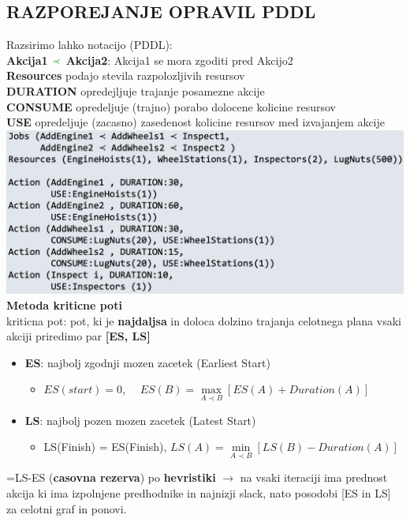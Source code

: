 \subsection{RAZPOREJANJE OPRAVIL PDDL}
Razsirimo lahko notacijo (PDDL):\\
\textbf{Akcija1 $\green{\prec}$ Akcija2}: Akcija1 se mora zgoditi pred Akcijo2\\
\textbf{Resources} podajo stevila razpolozljivih resursov\\
\textbf{DURATION} opredejljuje trajanje posamezne akcije\\
\textbf{CONSUME} opredeljuje (trajno) porabo dolocene kolicine resursov\\
\textbf{USE} opredeljuje (zacasno) zasedenost kolicine resursov med izvajanjem akcije\\
\includegraphics[width=\columnwidth]{./images/pddl.png}
\textbf{Metoda kriticne poti}\\
kriticna pot: pot, ki je \textbf{najdaljsa} in doloca dolzino trajanja celotnega plana
vsaki akciji priredimo par \textbf{[ES, LS]}
\begin{itemize}[leftmargin=*,noitemsep,topsep=0pt]
    \item \textbf{ES}: najbolj zgodnji mozen zacetek (Earliest Start)
    \begin{itemize}[leftmargin=*,noitemsep,topsep=0pt]
        \item $ES(start) = 0$, $\quad ES(B) = \max\limits_{A \prec B} \left[ ES(A) + Duration(A)\right]$
    \end{itemize}
    \item \textbf{LS}: najbolj pozen mozen zacetek (Latest Start)
    \begin{itemize}[leftmargin=*,noitemsep,topsep=0pt]
        \item LS(Finish) = ES(Finish), $LS(A) = \min\limits_{A\prec B}\left[ LS(B) - Duration(A)\right]$
    \end{itemize}
\end{itemize}
=LS-ES (\textbf{casovna rezerva})
 po \textbf{hevristiki } $\rightarrow$ na vsaki iteraciji ima prednost akcija 
ki ima izpolnjene predhodnike in najnizji slack, nato posodobi [ES in LS] za celotni graf in ponovi.

